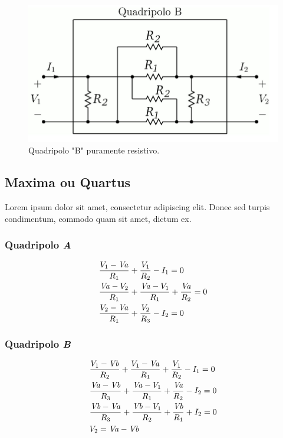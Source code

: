 \documentclass[12pt,twoside, a4paper, twocolumn]{article}
\begin{document}
\begin{figure}[h]
    \centering
    \includegraphics[width=1\columnwidth]{images/quadripolob.png}
    \caption{Quadripolo "B" puramente resistivo.}
\end{figure}

\subsection{Maxima ou Quartus}

Lorem ipsum dolor sit amet, consectetur adipiscing elit. Donec sed turpis condimentum, commodo quam sit amet, dictum ex.

\subsubsection{Quadripolo \emph{A}}

\begin{equation}
    \begin{aligned}
         & {{V_{1}-{\it Va}}\over{R_{1}}}+{{V_{1}}\over{R_{2}}}-I_{1}=0                              \\
         & {{{\it Va}-V_{2}}\over{R_{1}}}+{{{\it Va}-V_{1}}\over{R_{1}}}+{{ {\it Va}}\over{R_{2}}}=0 \\
         & {{V_{2}-{\it Va}}\over{R_{1}}}+{{V_{2}}\over{R_{3}}}-I_{2}=0
    \end{aligned}
\end{equation}

\subsubsection{Quadripolo \emph{B}}

\begin{equation}
    \begin{aligned}
         & {{V_{1}-{\it Vb}}\over{R_{2}}}+{{V_{1}-{\it Va}}\over{R_{1}}}+{{ V_{1}}\over{R_{2}}}-I_{1}=0       \\
         & {{{\it Va}-{\it Vb}}\over{R_{3}}}+{{{\it Va}-V_{1}}\over{R_{1}}}+{{ {\it Va}}\over{R_{2}}}-I_{2}=0 \\
         & {{{\it Vb}-{\it Va}}\over{R_{3}}}+{{{\it Vb}-V_{1}}\over{R_{2}}}+{{ {\it Vb}}\over{R_{1}}}+I_{2}=0 \\
         & V_{2}={\it Va}-{\it Vb}
    \end{aligned}
\end{equation}
\end{document}
